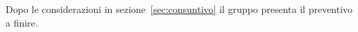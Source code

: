 \documentclass[../piano-di-progetto.tex]{subfiles}
\begin{document}
Dopo le considerazioni in sezione~\ref{sec:consuntivo} il gruppo presenta il preventivo a finire.
\end{document}
